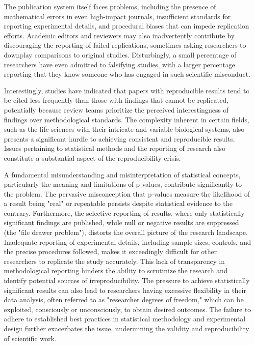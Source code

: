 \documentclass{article}
\begin{document}
The publication system itself faces problems, including the presence of mathematical errors in even high-impact journals, insufficient standards for reporting experimental details, and procedural biases that can impede replication efforts. Academic editors and reviewers may also inadvertently contribute by discouraging the reporting of failed replications, sometimes asking researchers to downplay comparisons to original studies. Disturbingly, a small percentage of researchers have even admitted to falsifying studies, with a larger percentage reporting that they know someone who has engaged in such scientific misconduct.

Interestingly, studies have indicated that papers with reproducible results tend to be cited less frequently than those with findings that cannot be replicated, potentially because review teams prioritize the perceived interestingness of findings over methodological standards. The complexity inherent in certain fields, such as the life sciences with their intricate and variable biological systems, also presents a significant hurdle to achieving consistent and reproducible results. Issues pertaining to statistical methods and the reporting of research also constitute a substantial aspect of the reproducibility crisis.

A fundamental misunderstanding and misinterpretation of statistical concepts, particularly the meaning and limitations of p-values, contribute significantly to the problem. The pervasive misconception that p-values measure the likelihood of a result being "real" or repeatable persists despite statistical evidence to the contrary. Furthermore, the selective reporting of results, where only statistically significant findings are published, while null or negative results are suppressed (the "file drawer problem"), distorts the overall picture of the research landscape. Inadequate reporting of experimental details, including sample sizes, controls, and the precise procedures followed, makes it exceedingly difficult for other researchers to replicate the study accurately. This lack of transparency in methodological reporting hinders the ability to scrutinize the research and identify potential sources of irreproducibility. The pressure to achieve statistically significant results can also lead to researchers having excessive flexibility in their data analysis, often referred to as "researcher degrees of freedom," which can be exploited, consciously or unconsciously, to obtain desired outcomes. The failure to adhere to established best practices in statistical methodology and experimental design further exacerbates the issue, undermining the validity and reproducibility of scientific work.
\end{document}
